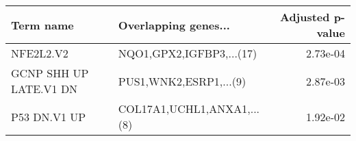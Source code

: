 \begin{tabular}{llr}
\toprule
             Term name &       Overlapping genes... &  Adjusted p-value \\
\midrule
             NFE2L2.V2 &   NQO1,GPX2,IGFBP3,...(17) &          2.73e-04 \\
GCNP SHH UP LATE.V1 DN &     PUS1,WNK2,ESRP1,...(9) &          2.87e-03 \\
          P53 DN.V1 UP & COL17A1,UCHL1,ANXA1,...(8) &          1.92e-02 \\
\bottomrule
\end{tabular}
